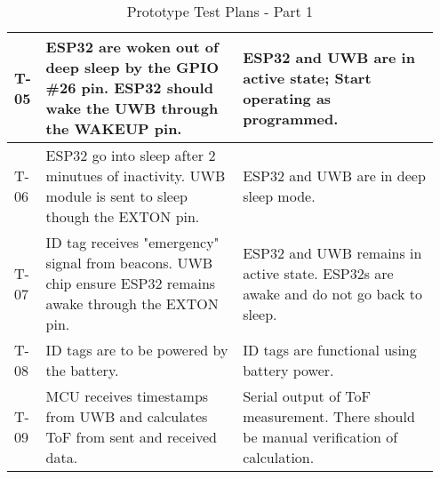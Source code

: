 \begin{table}[h!]
\begin{tabular}{|m{0.05\linewidth}|m{0.45\linewidth}|m{0.45\linewidth}|}
    T-05
    & ESP32 are woken out of deep sleep by the GPIO \#26 pin. ESP32 should wake the UWB through the WAKEUP pin.
    & ESP32 and UWB are in active state; Start operating as programmed. \\ 
    \hline

    T-06
    & ESP32 go into sleep after 2 minutues of inactivity. UWB module is sent to sleep though the EXTON pin.
    & ESP32 and UWB are in deep sleep mode. \\ 
    \hline

    T-07
    & ID tag receives "emergency" signal from beacons. UWB chip ensure ESP32 remains awake through the EXTON pin.
    & ESP32 and UWB remains in active state. ESP32s are awake and do not go back to sleep. \\ 
    \hline

    T-08
    & ID tags are to be powered by the battery.
    & ID tags are functional using battery power. \\ 
    \hline   
    
    T-09
    & MCU receives timestamps from UWB and calculates ToF from sent and received data.
    & Serial output of ToF measurement. There should be manual verification of calculation.   \\ 
    \hline
    
\end{tabular}
    \caption{Prototype Test Plans - Part 1}
\end{table}    
    
\pagebreak    
    
